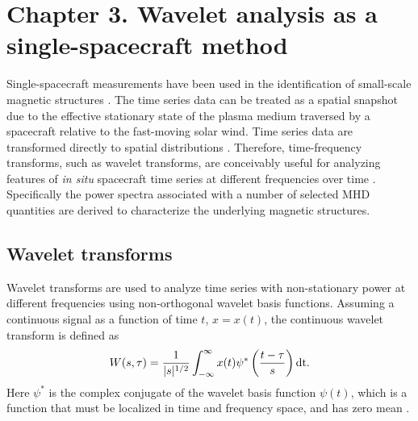 \chapter{Chapter 3. Wavelet analysis as a single-spacecraft method}

Single-spacecraft measurements have been used in the identification of small-scale magnetic structures \citep{Pecora:2019, Telloni:2012, Hu:2018, Zheng:2018, Zhao:2020}. The time series data can be treated as a spatial snapshot due to the effective stationary state of the plasma medium traversed by a spacecraft relative to the fast-moving solar wind. Time series data are transformed directly to spatial distributions \citep{Taylor:1938}. Therefore, time-frequency transforms, such as wavelet transforms, are conceivably useful for analyzing features of \textit{in situ} spacecraft time series at different frequencies over time \citep{Torrence:1998}. Specifically the power spectra associated with a number of selected MHD quantities are derived to characterize the underlying magnetic structures.

\section{Wavelet transforms}
Wavelet transforms are used to analyze time series with non-stationary power at different frequencies \citep{Torrence:1998} using non-orthogonal wavelet basis functions. Assuming a continuous signal as a function of time $t$, $x=x(t)$, the continuous wavelet transform is defined as
\begin{equation}
    W(s,\tau) = \frac{1}{|s|^{1/2}}\int_{-\infty}^\infty x(t)\psi^*\left( \frac{t-\tau}{s} \right)\textnormal{dt}.
    \label{eq:wavetrans}
\end{equation}
Here $\psi^*$ is the complex conjugate of the wavelet basis function $\psi(t)$, which is a function that must be localized in time and frequency space, and has zero mean \citep{Torrence:1998}.

